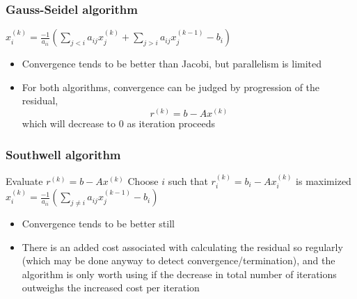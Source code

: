 \documentclass{beamer}
\begin{document}
\begin{frame}
	\frametitle{Gauss-Seidel algorithm}
	\begin{algorithm}[H]
		\DontPrintSemicolon
		 {
			 {
				$x_i^{(k)} = \frac{-1}{a_{ii}}\left( \sum_{j < i} a_{ij}x_j^{(k)} + \sum_{j > i} a_{ij}x_j^{(k-1)} - b_i \right)$\;
			}
		}
	\end{algorithm}
	\begin{itemize}
		\item Convergence tends to be better than Jacobi, but parallelism is limited
		\item For both algorithms, convergence can be judged by progression of the residual,
			\begin{equation}
				r^{(k)} = b - Ax^{(k)}
			\end{equation}
			  which will decrease to 0 as iteration proceeds
	\end{itemize}
\end{frame}

\begin{frame}
	\frametitle{Southwell algorithm}
	\begin{algorithm}[H]
		\DontPrintSemicolon
		 {
			Evaluate $r^{(k)} = b - Ax^{(k)}$ \;
			Choose $i$ such that $r_i^{(k)} = b_i - Ax^{(k)}_i$ is maximized \;
			$x_i^{(k)} = \frac{-1}{a_{ii}}\left( \sum_{j\neq i} a_{ij}x_j^{(k-1)} - b_i \right)$\;
		}
	\end{algorithm}
	\begin{itemize}
		\item Convergence tends to be better still
		\item There is an added cost associated with calculating the residual so regularly (which may be done anyway to detect convergence/termination), and the algorithm is only worth using if the decrease in total number of iterations outweighs the increased cost per iteration
	\end{itemize}
\end{frame}
\end{document}
